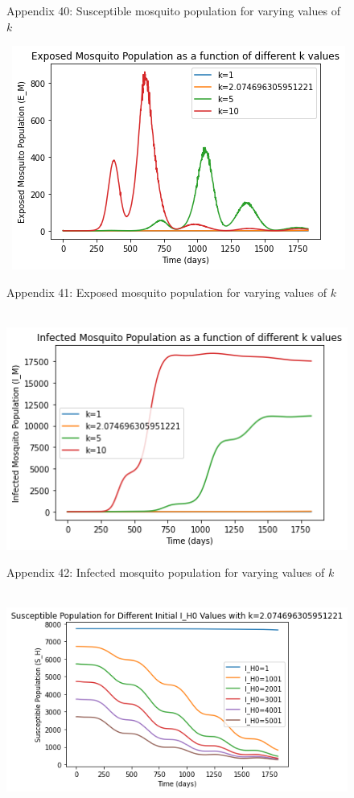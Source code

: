 \documentclass[
	12pt,				%
	oneside,			%
	a4paper,			%
	english,			%
	brazil				%
	]{abntex2}
\begin{document}
\begin{apendicesenv}
\begin{figure}[!ht]
	\caption*{Appendix 40: Susceptible mosquito population for varying values of $k$}
\end{figure} 
\begin{figure}[!ht]
	\centering
	\hbox{\hspace{7.0em} \includegraphics[scale=0.65] {THESIS-EM_for_k_values.png}}
	\caption*{Appendix 41: Exposed mosquito population for varying values of $k$}
\end{figure}
\begin{figure}[!ht]
	\centering
	\hbox{\hspace{7.0em} \includegraphics[scale=0.65] {THESIS-IM_for_k_values.png}}
	\caption*{Appendix 42: Infected mosquito population for varying values of $k$}
\end{figure}
\newpage
\begin{figure}[!ht]
	\centering
	\hbox{\hspace{7.0em} \includegraphics[scale=0.65] {THESIS-SH_k=2_075.png}}

\end{figure}
\end{apendicesenv}
\end{document}
